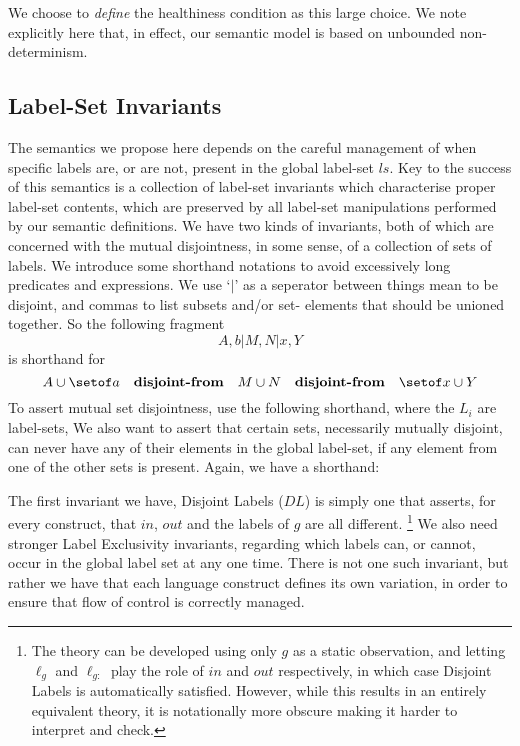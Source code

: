 We choose to \emph{define} the healthiness condition as
this large choice.
We note explicitly here that, in effect, our semantic model is based on
unbounded non-determinism.


\subsection{Label-Set Invariants}


The semantics we propose here depends on the careful management
of when specific labels are, or are not,
present in the global label-set $ls$.
Key to the success of this semantics is a collection of label-set invariants
which characterise proper label-set contents,
which are preserved by all label-set manipulations performed
by our semantic definitions.
We have two kinds of invariants,
both of which are concerned with the mutual disjointness, in some sense,
of a collection of sets of labels.
We introduce some shorthand notations to avoid excessively long predicates and expressions. We use `$\mid$' as a seperator between things mean to be disjoint,
and commas to list subsets and/or set- elements that should be unioned together.
So the following fragment
\[  A,b | M,N | x,Y \]
is shorthand for
\[ A \cup \setof a
  \quad \textbf{disjoint-from} \quad
  M \cup N
  \quad \textbf{disjoint-from} \quad
 \setof x \cup Y
\]
To assert mutual set disjointness,
use the following shorthand, where the $L_i$ are label-sets,
We also want to assert that certain sets, necessarily mutually disjoint,
can never have any of their elements in the global label-set,
if any element from one of the other sets is present.
Again, we have a shorthand:

The first invariant we have, Disjoint Labels ($DL$) is simply one that asserts,
for every construct, that $in$, $out$ and the labels of $g$
are all different.
\footnote{The theory can be developed using only $g$ as a static observation,
and letting $\ell_g$ and $\ell_{g:}$ play the role of $in$ and $out$
respectively, in which case Disjoint Labels is automatically satisfied.
However, while this results in an entirely equivalent theory,
it is notationally more obscure
making it harder to interpret and check.
}%
We also need stronger Label Exclusivity invariants,
regarding which labels can, or cannot,
occur in the global label set at any one time.
There is not one such invariant,
but rather we have that each language construct defines its own
variation, in order to ensure that flow of control is correctly managed.

